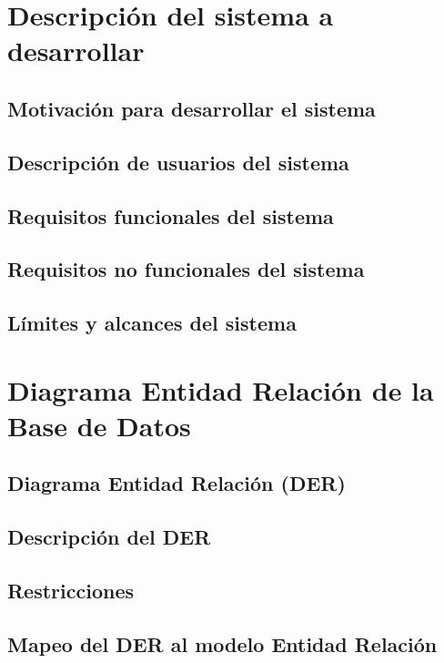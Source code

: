 \documentclass[11pt]{article}
\begin{document}
\section{Descripción del sistema a desarrollar}

\subsection{Motivación para desarrollar el sistema}

\subsection{Descripción de usuarios del sistema}

\subsection{Requisitos funcionales del sistema}

\subsection{Requisitos no funcionales del sistema}

\subsection{Límites y alcances del sistema}




\section{Diagrama Entidad Relación de la Base de Datos}
\subsection{Diagrama Entidad Relación (DER)}

\subsection{Descripción del DER}

\subsection{Restricciones}

\subsection{Mapeo del DER al modelo Entidad Relación}
\end{document}
